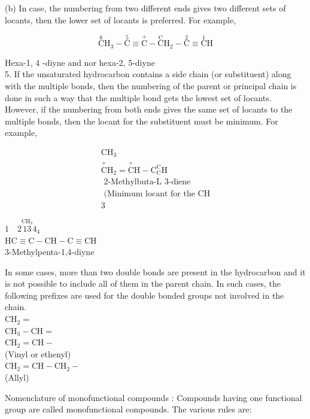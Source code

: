 \documentclass[10pt]{article}
\begin{document}
(b) In case, the numbering from two different ends gives two different sets of locants, then the lower set of locants is preferred. For example,

$$
\stackrel{6}{\mathrm{C}} \mathrm{H}_{3}-\stackrel{5}{\mathrm{C}} \equiv \stackrel{+}{\mathrm{C}}-\stackrel{\mathrm{C}}{\mathrm{C}} \mathrm{H}_{2}-\stackrel{2}{\mathrm{C}} \equiv \stackrel{1}{\mathrm{C}} \mathrm{H}
$$

Hexa-1, 4 -diyne and nor hexa-2, 5-diyne\\
5. If the unsaturated hydrocarbon contains a side chain (or substituent) along with the multiple bonds, then the numbering of the parent or principal chain is done in such a way that the multiple bond gets the lowest set of locants. However, if the numbering from both ends gives the same set of locants to the multiple bonds, then the locant for the substituent must be minimum. For example,

$$
\begin{gathered}
\mathrm{CH}_{3} \\
\stackrel{+}{\mathrm{C}} \mathrm{H}_{2}=\stackrel{+}{\mathrm{C}} \mathrm{H}-\mathrm{C}_{\mathrm{C}}^{\mathrm{C}} \mathrm{H} \\
\text { 2-Methylbuta-L 3-diene } \\
\text { (Minimum locant for the } \mathrm{CH} \\
3
\end{gathered}
$$

$1 \quad 2 \stackrel{\mathrm{CH}_{3}}{13} 4_{4}$\\
$\mathrm{HC} \equiv \mathrm{C}-\mathrm{CH}-\mathrm{C} \equiv \mathrm{CH}$\\
3-Methylpenta-1,4-diyne

In some cases, more than two double bonds are present in the hydrocarbon and it is not possible to include all of them in the parent chain. In such cases, the following prefixes are used for the double bonded groups not involved in the chain.\\
$\mathrm{CH}_{2}=$\\
$\mathrm{CH}_{3}-\mathrm{CH}=$\\
$\mathrm{CH}_{2}=\mathrm{CH}-$\\
(Vinyl or ethenyl)\\
$\mathrm{CH}_{2}=\mathrm{CH}-\mathrm{CH}_{2}-$\\
(Allyl)

Nomenclature of monofunctional compounds : Compounds having one functional group are called monofunctional compounds. The various rules are:
\end{document}
